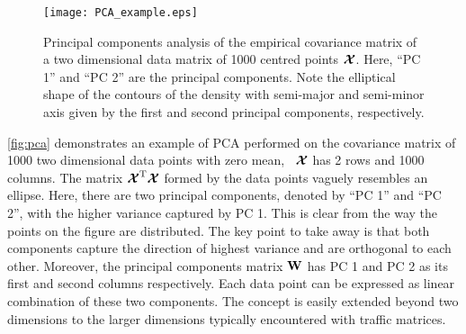 \begin{figure}[thbp] 
  \begin{center}
     \texttt{[image: PCA\_example.eps]}
    \caption{Principal components analysis of the empirical covariance matrix of a two dimensional 
    data matrix of 1000 centred points $\boldsymbol{\mathcal{X}}$. Here, ``PC 1''  and ``PC 2'' are the principal 
    components. Note the elliptical shape of the contours of the
    density with semi-major and semi-minor axis given by the first and
    second principal components, respectively.  \label{fig:pca}}
  \end{center}
 \end{figure}
 
\autoref{fig:pca} demonstrates an example of PCA performed on the covariance matrix of 
1000 two dimensional data points with zero mean, \ie~$\boldsymbol{\mathcal{X}}$ has 2 rows and 1000 columns. 
The matrix $\boldsymbol{\mathcal{X}}^{\mathrm{T}} \boldsymbol{\mathcal{X}}$ formed by the data points vaguely resembles an ellipse. Here, there
are two principal components, denoted by  ``PC 1''  and ``PC 2'', with the higher variance
captured by PC 1. This is clear from the way the points on the figure
are distributed. The key point to take away is that both components capture the direction
of highest variance and are orthogonal to each other.  Moreover, the principal components matrix 
$\mathbf{W}$ has PC 1 and PC 2 as its first and second columns respectively. Each data point 
can be expressed as linear combination of these two components. The concept is easily
extended beyond two dimensions to the larger dimensions typically encountered with
traffic matrices.

